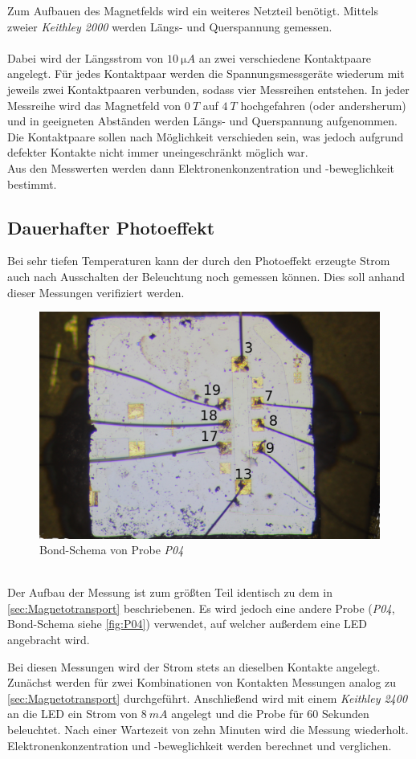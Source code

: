 Zum Aufbauen des Magnetfelds wird ein weiteres Netzteil benötigt.
Mittels zweier \emph{Keithley 2000} werden Längs- und Querspannung gemessen.\\\\
Dabei wird der Längsstrom von $10\ \si{\micro A}$ an zwei verschiedene Kontaktpaare angelegt.
Für jedes Kontaktpaar werden die Spannungsmessgeräte wiederum mit jeweils zwei Kontaktpaaren verbunden, sodass vier Messreihen entstehen.
In jeder Messreihe wird das Magnetfeld von $0\ \si{T}$ auf $4\ \si{T}$ hochgefahren (oder andersherum) und in geeigneten Abständen werden Längs- und Querspannung aufgenommen.
Die Kontaktpaare sollen nach Möglichkeit verschieden sein, was jedoch aufgrund defekter Kontakte nicht immer uneingeschränkt möglich war.\\
Aus den Messwerten werden dann Elektronenkonzentration und -beweglichkeit bestimmt.

\clearpage

\subsection{Dauerhafter Photoeffekt}\label{sec:Photoeffekt}
Bei sehr tiefen Temperaturen kann der durch den Photoeffekt erzeugte Strom auch nach Ausschalten der Beleuchtung noch gemessen können.
Dies soll anhand dieser Messungen verifiziert werden.

\begin{figure}
\includegraphics[scale=0.05]{Pictures/P04BondSchema}
\caption{Bond-Schema von Probe \emph{P04}}
\label{fig:P04}
\end{figure}
\hfill\\
Der Aufbau der Messung ist zum größten Teil identisch zu dem in \autoref{sec:Magnetotransport} beschriebenen. Es wird jedoch eine andere Probe (\emph{P04}, Bond-Schema siehe \autoref{fig:P04}) verwendet, auf welcher außerdem eine LED angebracht wird.

Bei diesen Messungen wird der Strom stets an dieselben Kontakte angelegt.
Zunächst werden für zwei Kombinationen von Kontakten Messungen analog zu \autoref{sec:Magnetotransport} durchgeführt.
Anschließend wird mit einem \emph{Keithley 2400} an die LED ein Strom von $8\ \si{mA}$ angelegt und die Probe für $60$ Sekunden beleuchtet.
Nach einer Wartezeit von zehn Minuten wird die Messung wiederholt.\\
Elektronenkonzentration und -beweglichkeit werden berechnet und verglichen.
